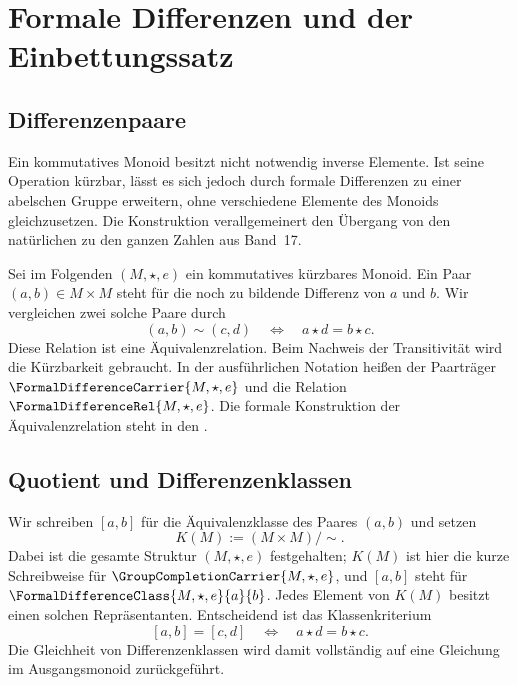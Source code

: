 \chapter{Formale Differenzen und der Einbettungssatz}

\section{Differenzenpaare}

Ein kommutatives Monoid besitzt nicht notwendig inverse Elemente.
Ist seine Operation kürzbar, lässt es sich jedoch durch formale
Differenzen zu einer abelschen Gruppe erweitern, ohne verschiedene
Elemente des Monoids gleichzusetzen. Die Konstruktion verallgemeinert
den Übergang von den natürlichen zu den ganzen Zahlen aus Band~17.

Sei im Folgenden \((M,\star,e)\) ein kommutatives kürzbares Monoid.
Ein Paar \((a,b)\in M\times M\) steht für die noch zu bildende
Differenz von \(a\) und \(b\). Wir vergleichen zwei solche Paare durch
\[
  (a,b)\sim(c,d)\quad\Longleftrightarrow\quad a\star d=b\star c.
\]
Diese Relation ist eine Äquivalenzrelation. Beim Nachweis der
Transitivität wird die Kürzbarkeit gebraucht. In der ausführlichen
Notation heißen der Paarträger
\(\FormalDifferenceCarrier{M,\star,e}\) und die Relation
\(\FormalDifferenceRel{M,\star,e}\).
Die %
  {formale Konstruktion der Äquivalenzrelation} steht in den
\DifferencesProofsLink{}.

{}
{}

\section{Quotient und Differenzenklassen}

Wir schreiben \([a,b]\) für die Äquivalenzklasse des Paares \((a,b)\)
und setzen
\[
  K(M):=(M\times M)/{\sim}.
\]
Dabei ist die gesamte Struktur \((M,\star,e)\) festgehalten;
\(K(M)\) ist hier die kurze Schreibweise für
\(\GroupCompletionCarrier{M,\star,e}\), und \([a,b]\) steht für
\(\FormalDifferenceClass{M,\star,e}{a}{b}\).
Jedes Element von \(K(M)\) besitzt einen solchen Repräsentanten.
Entscheidend ist das Klassenkriterium
\[
  [a,b]=[c,d]\quad\Longleftrightarrow\quad a\star d=b\star c.
\]
Die %
  {Gleichheit von Differenzenklassen} wird damit vollständig auf eine
Gleichung im Ausgangsmonoid zurückgeführt.

